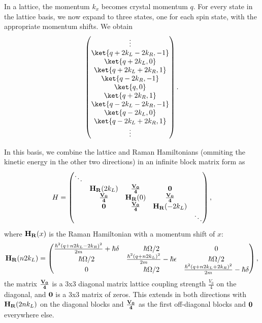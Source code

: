 In a lattice, the momentum $k_x$ becomes crystal momentum $q$. For every state in the lattice basis, we now expand to three states, one for each spin state, with the appropriate momentum shifts. We obtain
\begin{equation}
 \begin{pmatrix} \vdots \\
\ket{q+2k_L-2k_R,-1}\\
 \ket{q+2k_L,0}\\
\ket{q+2k_L+2k_R,1}\\
\ket{q-2k_R,-1}\\
 \ket{q,0}\\
\ket{q+2k_R,1}\\
\ket{q-2k_L-2k_R,-1}\\
 \ket{q-2k_L,0}\\
\ket{q-2k_L+2k_R,1}\\
\vdots
\end{pmatrix} \\.
\end{equation}

In this basis, we combine the lattice and Raman Hamiltonians (ommiting the kinetic energy in the other two directions) in an infinite block matrix form as 
\begin{equation}
H =
 \begin{pmatrix} \ddots &  & & & \\ 
 &{\bf H_R}(2k_L)  & {\bf \frac{V_0}{4}} &{\bf 0} &  \\
 &  {\bf \frac{V_0}{4}} &{\bf H_R}(0) & {\bf \frac{V_0}{4}}&  \\
 & {\bf 0} &  {\bf \frac{V_0}{4}} & {\bf H_R}(-2k_L)  &  \\
 & & & &  \ddots \end{pmatrix} \\,
\label{eqn:SynDimHam}
\end{equation}
where ${\bf H_R}(x)$ is the Raman Hamiltonian with a momentum shift of $x$:
 \begin{equation}
{\bf H_R}(n 2k_L) = 
 \begin{pmatrix} \frac{\hbar^2(q + n 2k_L -2k_R)^2}{2m}+\hbar\delta & \hbar\Omega/2  &  0  \\ 
\hbar\Omega/2 & \frac{\hbar^2 (q+n 2k_L)^2}{2m} - \hbar\epsilon &  \hbar\Omega/2\\
 0 & \hbar\Omega/2 &  \frac{\hbar^2(q+n 2k_L+2k_R)^2}{2m} -\hbar\delta  \\
 \end{pmatrix} \\,
\end{equation}
the matrix ${\bf \frac{V_0}{4}}$ is a 3x3 diagonal matrix lattice coupling strength $\frac{V_0}{4}$ on the diagonal, and $\bf 0$ is a 3x3 matrix of zeros. This extends in both directions with ${\bf H_R}(2nk_L)$ on the diagonal blocks and ${\bf \frac{V_0}{4}}$ as the first off-diagonal blocks and $\bf 0$ everywhere else. 

